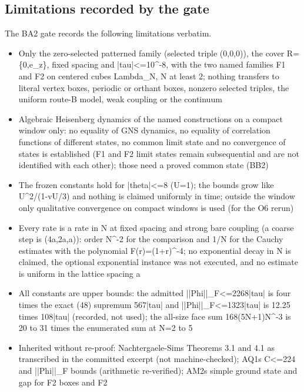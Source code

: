 \subsection{Limitations recorded by the gate}
\label{sec:ba2-limits}
The BA2 gate records the following limitations verbatim.
\begin{gatequote}
\begin{itemize}
\item Only the zero-selected patterned family (selected triple (0,0,0)), the
cover R=\{0,e\_z\}, fixed spacing and |tau|<=10\textasciicircum{}-8, with the
two named families F1 and F2 on centered cubes Lambda\_N, N at least 2;
nothing transfers to literal vertex boxes, periodic or orthant boxes, nonzero
selected triples, the uniform route-B model, weak coupling or the continuum
\item Algebraic Heisenberg dynamics of the named constructions on a compact
window only: no equality of GNS dynamics, no equality of correlation functions
of different states, no common limit state and no convergence of states is
established (F1 and F2 limit states remain subsequential and are not
identified with each other); those need a proved common state (BB2)
\item The frozen constants hold for |theta|<=8 (U=1); the bounds grow like
U\textasciicircum{}2/(1-vU/3) and nothing is claimed uniformly in time;
outside the window only qualitative convergence on compact windows is used
(for the O6 rerun)
\item Every rate is a rate in N at fixed spacing and strong bare coupling (a
coarse step is (4a,2a,a)): order N\textasciicircum{}-2 for the comparison and
1/N for the Cauchy estimates with the polynomial
F(r)=(1+r)\textasciicircum{}-4; no exponential decay in N is claimed, the
optional exponential instance was not executed, and no estimate is uniform in
the lattice spacing a
\item All constants are upper bounds: the admitted ||Phi||\_F<=2268|tau| is
four times the exact (48) supremum 567|tau| and
||Phi\textquotesingle{}||\_F<=1323|tau| is 12.25 times 108|tau| (recorded, not
used); the all-size face sum 168(5N+1)N\textasciicircum{}-3 is 20 to 31 times
the enumerated sum at N=2 to 5
\item Inherited without re-proof: Nachtergaele-Sims Theorems 3.1 and 4.1 as
transcribed in the committed excerpt (not machine-checked);
AQ1\textquotesingle{}s C<=224 and ||Phi||\_F bounds (arithmetic re-verified);
AM2\textquotesingle{}s simple ground state and gap for F2 boxes and F2

\end{itemize}
\end{gatequote}
